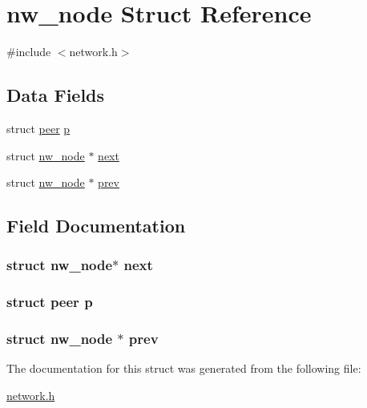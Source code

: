 \hypertarget{structnw__node}{\section{nw\-\_\-node Struct Reference}
\label{structnw__node}
}


{\ttfamily \#include $<$network.\-h$>$}

\subsection*{Data Fields}
\begin{DoxyCompactItemize}
\item 
struct \hyperlink{structpeer}{peer} \hyperlink{structnw__node_a932cfcfb155efa2a172f2b31c0b1e9d1}{p}
\item 
struct \hyperlink{structnw__node}{nw\-\_\-node} $\ast$ \hyperlink{structnw__node_af74fe72fb8a969fca91a639cc89f2bd9}{next}
\item 
struct \hyperlink{structnw__node}{nw\-\_\-node} $\ast$ \hyperlink{structnw__node_af9a01f4c2af69de14dc16aee37db886d}{prev}
\end{DoxyCompactItemize}


\subsection{Field Documentation}
\hypertarget{structnw__node_af74fe72fb8a969fca91a639cc89f2bd9}{
\subsubsection[{next}]{\setlength{\rightskip}{0pt plus 5cm}struct {\bf nw\-\_\-node}$\ast$ next}}\label{structnw__node_af74fe72fb8a969fca91a639cc89f2bd9}
\hypertarget{structnw__node_a932cfcfb155efa2a172f2b31c0b1e9d1}{
\subsubsection[{p}]{\setlength{\rightskip}{0pt plus 5cm}struct {\bf peer} p}}\label{structnw__node_a932cfcfb155efa2a172f2b31c0b1e9d1}
\hypertarget{structnw__node_af9a01f4c2af69de14dc16aee37db886d}{
\subsubsection[{prev}]{\setlength{\rightskip}{0pt plus 5cm}struct {\bf nw\-\_\-node} $\ast$ prev}}\label{structnw__node_af9a01f4c2af69de14dc16aee37db886d}


The documentation for this struct was generated from the following file\-:\begin{DoxyCompactItemize}
\item 
\hyperlink{network_8h}{network.\-h}\end{DoxyCompactItemize}
